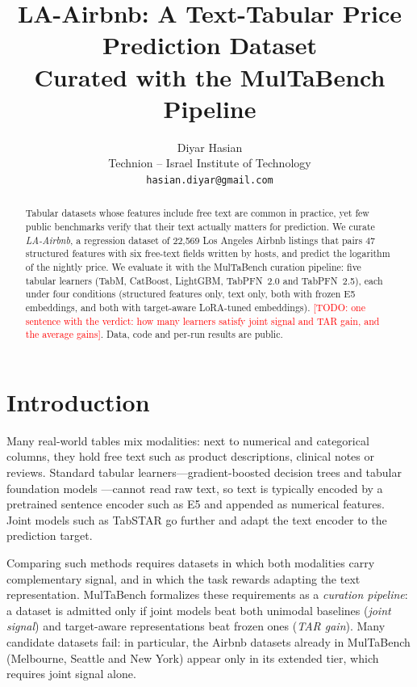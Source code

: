 \documentclass{article}
\title{LA-Airbnb: A Text-Tabular Price Prediction Dataset\\Curated with the MulTaBench Pipeline}
\author{
  Diyar Hasian \\
  Technion -- Israel Institute of Technology \\
  \texttt{hasian.diyar@gmail.com}
}
\newcommand{\todo}[1]{\textcolor{red}{[TODO: #1]}}
\begin{document}
\maketitle

\begin{abstract}
Tabular datasets whose features include free text are common in practice, yet few public benchmarks verify that
their text actually matters for prediction. We curate \emph{LA-Airbnb}, a regression dataset of 22,569 Los Angeles
Airbnb listings that pairs 47 structured features with six free-text fields written by hosts, and predict the
logarithm of the nightly price. We evaluate it with the MulTaBench curation pipeline: five tabular learners (TabM,
CatBoost, LightGBM, TabPFN~2.0 and TabPFN~2.5), each under four conditions (structured features only, text only,
both with frozen E5 embeddings, and both with target-aware LoRA-tuned embeddings). \todo{one sentence with the verdict:
how many learners satisfy joint signal and TAR gain, and the average gains}. Data, code and per-run results are public.
\end{abstract}

\section{Introduction}

Many real-world tables mix modalities: next to numerical and categorical columns, they hold free text such as product
descriptions, clinical notes or reviews. Standard tabular learners---gradient-boosted decision trees
\cite{chen2016xgboost,prokhorenkova2018catboost,ke2017lightgbm} and tabular foundation models
\cite{hollmann2025accurate,grinsztajn2025tabpfn25,qu2025tabicl}---cannot read raw text, so text is typically encoded
by a pretrained sentence encoder such as E5 \cite{wang2022e5} and appended as numerical features. Joint models such as
TabSTAR \cite{arazi2025tabstar} go further and adapt the text encoder to the prediction target.

Comparing such methods requires datasets in which both modalities carry complementary signal, and in which the task
rewards adapting the text representation. MulTaBench \cite{arazi2026multabench} formalizes these requirements as a
\emph{curation pipeline}: a dataset is admitted only if joint models beat both unimodal baselines (\emph{joint signal})
and target-aware representations beat frozen ones (\emph{TAR gain}). Many candidate datasets fail: in particular, the
Airbnb datasets already in MulTaBench (Melbourne, Seattle and New York) appear only in its extended tier, which
requires joint signal alone.
\end{document}
